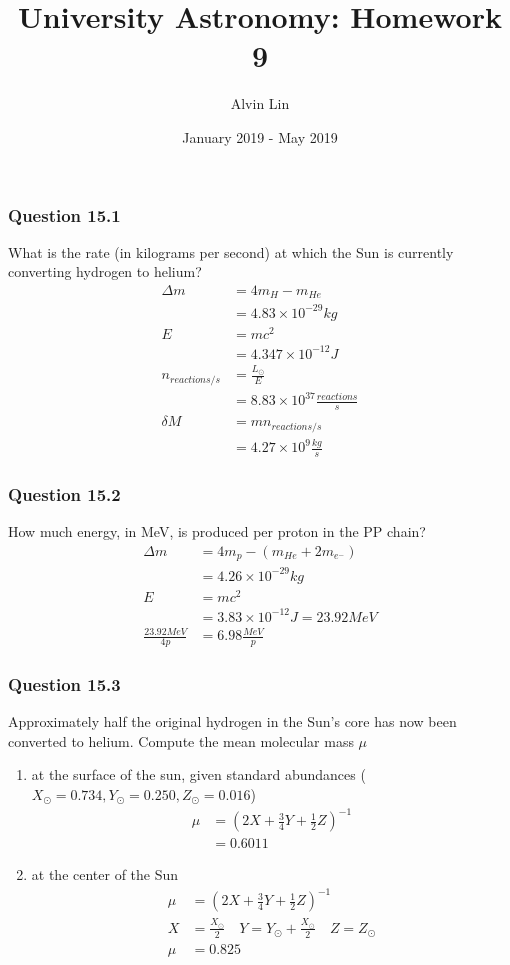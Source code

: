 \documentclass{math}
\title{University Astronomy: Homework 9}
\author{Alvin Lin}
\date{January 2019 - May 2019}
\begin{document}
\maketitle

\subsubsection*{Question 15.1}
What is the rate (in kilograms per second) at which the Sun is currently
converting hydrogen to helium?
\begin{align*}
  \Delta m &= 4m_H-m_{He} \\
  &= 4.83\times10^{-29}kg \\
  E &= mc^2 \\
  &= 4.347\times10^{-12}J \\
  n_{reactions/s} &= \frac{L_{\odot}}{E} \\
  &= 8.83\times10^{37}\frac{reactions}{s} \\
  \delta M &= mn_{reactions/s} \\
  &= 4.27\times10^9\frac{kg}{s}
\end{align*}

\subsubsection*{Question 15.2}
How much energy, in MeV, is produced per proton in the PP chain?
\begin{align*}
  \Delta m &= 4m_p-(m_{He}+2m_{e^-}) \\
  &= 4.26\times10^{-29}kg \\
  E &= mc^2 \\
  &= 3.83\times10^{-12}J = 23.92 MeV \\
  \frac{23.92 MeV}{4p} &= 6.98\frac{MeV}{p}
\end{align*}

\subsubsection*{Question 15.3}
Approximately half the original hydrogen in the Sun's core has now been
converted to helium. Compute the mean molecular mass \( \mu \)
\begin{enumerate}
  \item at the surface of the sun, given standard abundances (\( X_{\odot} =
    0.734, Y_{\odot} = 0.250, Z_{\odot} = 0.016 \))
  \begin{align*}
    \mu &= (2X+\frac{3}{4}Y+\frac{1}{2}Z)^{-1} \\
    &= 0.6011
  \end{align*}
  \item at the center of the Sun
  \begin{align*}
    \mu &= (2X+\frac{3}{4}Y+\frac{1}{2}Z)^{-1} \\
    X &= \frac{X_{\odot}}{2} \quad Y = Y_{\odot}+\frac{X_{\odot}}{2} \quad
      Z = Z_{\odot} \\
    \mu &= 0.825
  \end{align*}
\end{enumerate}
\end{document}
